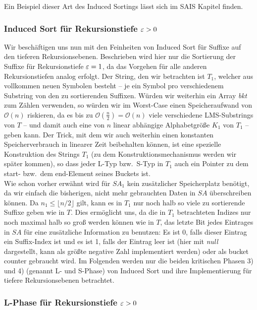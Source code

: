 Ein Beispiel dieser Art des Induced Sortings lässt sich im SAIS Kapitel finden.

\subsubsection{ Induced Sort für Rekursionstiefe $\varepsilon > 0$}

Wir beschäftigen uns nun mit den Feinheiten von Induced Sort für Suffixe auf den tieferen Rekursionsebenen. Beschrieben wird hier nur die Sortierung der Suffixe für Rekursionstiefe $\varepsilon = 1$, da das Vorgehen für alle anderen Rekursionstiefen analog erfolgt. Der String, den wir betrachten ist $T_1$, welcher aus vollkommen neuen Symbolen besteht -- je ein Symbol pro verschiedenem Substring von den zu sortierenden Suffixen. Würden wir weiterhin ein Array \textit{bkt} zum Zählen verwenden, so würden wir im Worst-Case einen Speicheraufwand von $\mathcal O(n)$ riskieren, da es bis zu $\mathcal O(\frac{n}{2}) = \mathcal O(n)$ viele verschiedene LMS-Substrings von $T$ -- und damit auch eine von $n$ linear abhängige Alphabetgröße $K_1$ von $T_1$ -- geben kann. Der Trick, mit dem wir auch weiterhin einen konstanten Speicherverbrauch in linearer Zeit beibehalten können, ist eine spezielle Konstruktion des Strings $T_1$ (zu dem Konstruktionsmechanismus werden wir später kommen), so dass jeder L-Typ bzw.\ S-Typ in $T_1$ auch ein Pointer zu dem start- bzw.\ dem end-Element seines Buckets ist.  \\
Wie schon vorher erwähnt wird für $SA_1$ kein zusätzlicher Speicherplatz benötigt, da wir einfach die bisherigen, nicht mehr gebrauchten Daten in $SA$ überschreiben können. Da $n_1  \leq \lfloor n/2 \rfloor$ gilt, kann es in $T_1$ nur noch halb so viele zu sortierende Suffixe geben wie in $T$. Dies ermöglicht uns, da die in $T_1$ betrachteten Indizes nur noch maximal halb so groß werden können wie in $T$, das letzte Bit jedes Eintrages in $SA$ für eine zusätzliche Information zu benutzen: Es ist 0, falls dieser Eintrag ein Suffix-Index ist und es ist 1, falls der Eintrag leer ist (hier mit \textit{null} dargestellt, kann als größte negative Zahl implementiert werden) oder als bucket counter gebraucht wird. Im Folgenden werden nur die beiden kritischen Phasen 3) und 4) (genannt L- und S-Phase) von Induced Sort und ihre Implementierung für tiefere Rekursionsebenen betrachtet.

\subsubsection{ L-Phase für Rekursionstiefe $\varepsilon > 0$}

